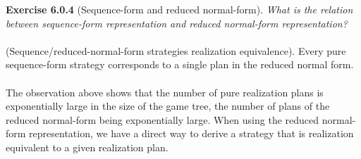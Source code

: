 \textbf{Exercise 6.0.4} (Sequence-form and reduced normal-form). \textit{What is the relation between sequence-form representation and reduced normal-form representation?}\\\\
(Sequence/reduced-normal-form strategies realization equivalence). Every pure sequence-form strategy corresponds to a single plan in the reduced normal form.\\\\
The observation above shows that the number of pure realization plans is exponentially large in the size of the game tree, the number of plans of the reduced normal-form being exponentially large. When using the reduced normal-form representation, we have a direct way to derive a strategy that is realization equivalent to a given realization plan.\\\\

